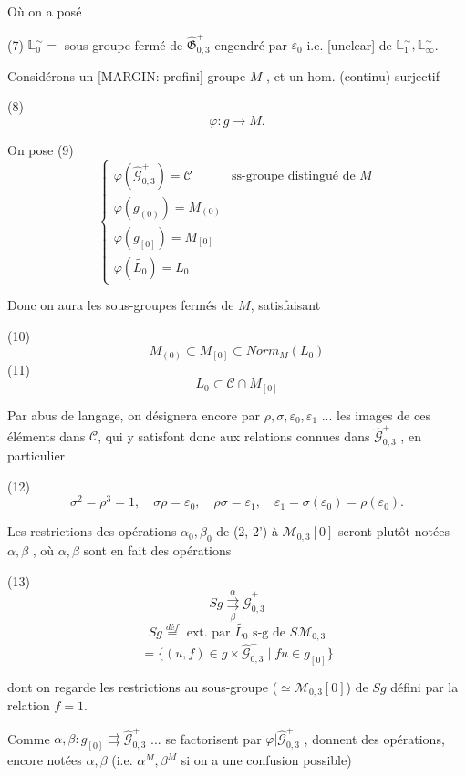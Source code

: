 Où on a posé

(7) $\mathbb{L}_0^\sim =$ sous-groupe fermé de $\widehat{\mathfrak{G}}_{0,3}^+$ engendré par $\varepsilon_0$ i.e. [unclear] de $\mathbb{L}_1^\sim , \mathbb{L}_\infty^\sim$.

\newpage


Considérons un [MARGIN: profini] groupe $M$ , et un hom. (continu) surjectif

(8) $$ \varphi : g \longrightarrow M .$$

On pose
(9) $$ \begin{cases} \varphi( \hat{\mathcal{G}}_{0,3}^+ ) = \mathcal{C} & \text{ss-groupe distingué de } M \\ \varphi( g_{(0)} ) = M_{(0)} \\ \varphi( g_{[0]} ) = M_{[0]} \\ \varphi( \tilde{L_0} ) = L_0 \end{cases} $$

Donc on aura les sous-groupes fermés de $M$, satisfaisant

(10) $$ M_{(0)} \subset M_{[0]} \subset Norm_M(L_0) $$
(11) $$ L_0 \subset \mathcal{C} \cap M_{[0]} $$

Par abus de langage, on désignera encore par $\rho, \sigma, \varepsilon_0, \varepsilon_1$ ... les images de ces éléments dans $\mathcal{C}$, qui y satisfont donc aux relations connues dans $\hat{\mathcal{G}}_{0,3}^+$ , en particulier

(12) $$ \sigma^2 = \rho^3 = 1 , \quad \sigma \rho = \varepsilon_0 , \quad \rho \sigma = \varepsilon_1 , \quad \varepsilon_1 = \sigma(\varepsilon_0) = \rho(\varepsilon_0) .$$

Les restrictions des opérations $\alpha_0, \beta_0$ de (2, 2') à $\mathcal{M}_{0,3}[0]$ seront plutôt notées $\alpha, \beta$ , où $\alpha, \beta$ sont en fait des opérations

(13) $$ Sg \overset{\alpha}{\underset{\beta}{\rightrightarrows}} \hat{\mathcal{G}}_{0,3}^+ $$
$$ Sg \overset{déf}{=} \text{ ext. par } \tilde{L_0} \text{ s-g de } S\mathcal{M}_{0,3} $$
$$ = \{ (u,f) \in g \times \hat{\mathcal{G}}_{0,3}^+ \mid f u \in g_{[0]} \} $$

dont on regarde les restrictions au sous-groupe ($\simeq \mathcal{M}_{0,3}[0]$) de $Sg$ défini par la relation $f=1$.

Comme $\alpha, \beta : g_{[0]} \rightrightarrows \hat{\mathcal{G}}_{0,3}^+$ ... se factorisent par $\varphi | \hat{\mathcal{G}}_{0,3}^+$ , donnent des opérations, encore notées $\alpha, \beta$ (i.e. $\alpha^M, \beta^M$ si on a une confusion possible)


